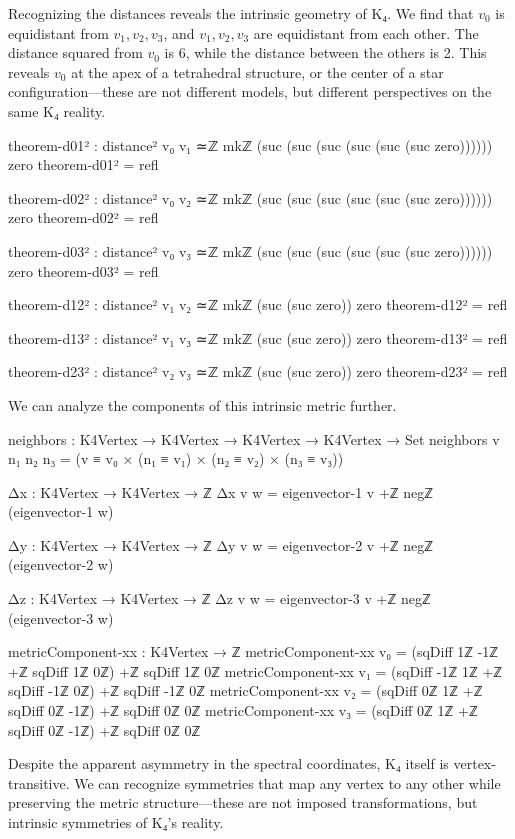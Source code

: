 \documentclass[11pt,a4paper]{book}
\begin{document}
Recognizing the distances reveals the intrinsic geometry of K₄. We find that $v_0$ is equidistant from $v_1, v_2, v_3$, and $v_1, v_2, v_3$ are equidistant from each other. The distance squared from $v_0$ is 6, while the distance between the others is 2. This reveals $v_0$ at the apex of a tetrahedral structure, or the center of a star configuration—these are not different models, but different perspectives on the same K₄ reality.

\begin{code}
theorem-d01² : distance² v₀ v₁ ≃ℤ mkℤ (suc (suc (suc (suc (suc (suc zero)))))) zero
theorem-d01² = refl

theorem-d02² : distance² v₀ v₂ ≃ℤ mkℤ (suc (suc (suc (suc (suc (suc zero)))))) zero
theorem-d02² = refl

theorem-d03² : distance² v₀ v₃ ≃ℤ mkℤ (suc (suc (suc (suc (suc (suc zero)))))) zero
theorem-d03² = refl

theorem-d12² : distance² v₁ v₂ ≃ℤ mkℤ (suc (suc zero)) zero
theorem-d12² = refl

theorem-d13² : distance² v₁ v₃ ≃ℤ mkℤ (suc (suc zero)) zero
theorem-d13² = refl

theorem-d23² : distance² v₂ v₃ ≃ℤ mkℤ (suc (suc zero)) zero
theorem-d23² = refl
\end{code}

We can analyze the components of this intrinsic metric further.

\begin{code}
neighbors : K4Vertex → K4Vertex → K4Vertex → K4Vertex → Set
neighbors v n₁ n₂ n₃ = (v ≡ v₀ × (n₁ ≡ v₁) × (n₂ ≡ v₂) × (n₃ ≡ v₃))

Δx : K4Vertex → K4Vertex → ℤ
Δx v w = eigenvector-1 v +ℤ negℤ (eigenvector-1 w)

Δy : K4Vertex → K4Vertex → ℤ
Δy v w = eigenvector-2 v +ℤ negℤ (eigenvector-2 w)

Δz : K4Vertex → K4Vertex → ℤ
Δz v w = eigenvector-3 v +ℤ negℤ (eigenvector-3 w)

metricComponent-xx : K4Vertex → ℤ
metricComponent-xx v₀ = (sqDiff 1ℤ -1ℤ +ℤ sqDiff 1ℤ 0ℤ) +ℤ sqDiff 1ℤ 0ℤ
metricComponent-xx v₁ = (sqDiff -1ℤ 1ℤ +ℤ sqDiff -1ℤ 0ℤ) +ℤ sqDiff -1ℤ 0ℤ
metricComponent-xx v₂ = (sqDiff 0ℤ 1ℤ +ℤ sqDiff 0ℤ -1ℤ) +ℤ sqDiff 0ℤ 0ℤ
metricComponent-xx v₃ = (sqDiff 0ℤ 1ℤ +ℤ sqDiff 0ℤ -1ℤ) +ℤ sqDiff 0ℤ 0ℤ
\end{code}

Despite the apparent asymmetry in the spectral coordinates, K₄ itself is vertex-transitive. We can recognize symmetries that map any vertex to any other while preserving the metric structure—these are not imposed transformations, but intrinsic symmetries of K₄'s reality.
\end{document}
